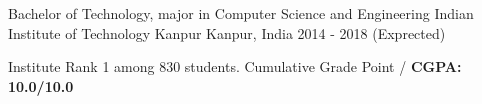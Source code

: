 


\begin{cventries}


\cventry
{Bachelor of Technology, major in Computer Science and Engineering} %
{Indian Institute of Technology Kanpur} %
{Kanpur, India} %
{2014 - 2018 (Exprected)} %
{ %
\begin{cvitems}
\item {Institute Rank 1 among 830 students. Cumulative Grade Point /
    \textbf{CGPA: 10.0/10.0}}
\end{cvitems}
}

\end{cventries}

